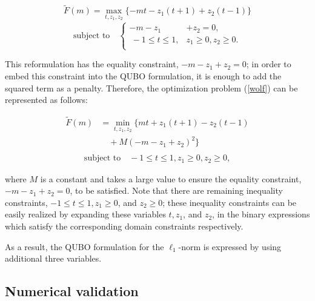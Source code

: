\documentclass[fp,twocolumn]{jpsj3}
\begin{document}
\begin{eqnarray}
  \widetilde{F}(m)=\max_{t,z_{1},z_{2}} \{-mt-z_{1}(t+1)+z_{2}(t-1)\} \label{wolf}
\end{eqnarray}
\begin{equation}
  \text{subject to} \quad \left\{
  \begin{aligned}
   -m-z_{1}&+z_{2}=0, \nonumber \\
   \ -1\leq t\leq 1, & z_{1}\geq 0, z_{2}\geq 0. \\
  \end{aligned}
  \right.
\end{equation}


This reformulation has the equality constraint, $-m-z_{1}+z_{2}=0$; in order to embed this constraint into the QUBO formulation, it is enough to add the squared term as a penalty. 
Therefore, the optimization problem (\ref{wolf}) can be represented as follows:

\begin{equation}
  \begin{aligned}
    \widetilde{F}(m)&=\min_{t,z_{1},z_{2}}{\{mt+z_{1}(t+1)-z_{2}(t-1)} \\
    &\quad+M(-m-z_{1}+z_{2})^{2}\} \label{after_wolf} \\
  \end{aligned}
\end{equation}
\begin{eqnarray}
  \text{subject to} \quad -1\leq t\leq 1, z_{1}\geq 0, z_{2}\geq 0, \nonumber
\end{eqnarray}


\noindent
where $M$ is a constant and takes a large value to ensure the equality constraint, $-m-z_{1}+z_{2}=0$, to be satisfied.
Note that there are remaining inequality constraints, $-1\leq t\leq 1, z_{1}\geq 0$, and $z_{2}\geq 0$;
these inequality constraints can be easily realized by expanding these variables $t,z_{1}$, and $z_{2}$, in the binary expressions which satisfy the corresponding domain constraints respectively.

As a result, the QUBO formulation for the $\ell_{1}$-norm is expressed by using additional three variables.

\subsection{Numerical validation}
\end{document}
